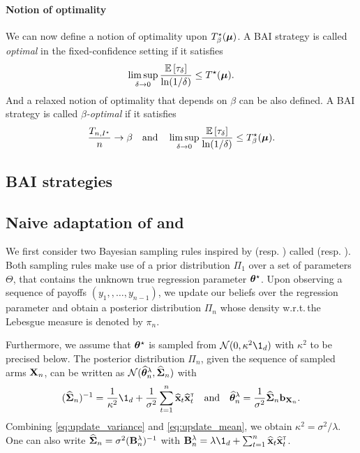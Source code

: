 \paragraph{Notion of optimality}
We can now define a notion of optimality upon $T^\star_\beta({\boldsymbol \mu})$. A BAI strategy is called \emph{optimal} in the fixed-confidence setting if it satisfies
\[
    \limsup_{\delta \rightarrow 0}\frac{\mathbb{E}\left[\tau_\delta\right]}{\ln(1/\delta)} \leq T^\star({\boldsymbol \mu}).
\]
And a relaxed notion of optimality that depends on $\beta$ can be also defined. A BAI strategy is called \emph{$\beta$-optimal} if it satisfies 
\[
    \frac{T_{n,I^\star}}{n}\rightarrow \beta \quad \text{and} \quad \limsup_{\delta \rightarrow 0}\frac{\mathbb{E}\left[\tau_\delta\right]}{\ln(1/\delta)} \leq T^\star_\beta({\boldsymbol \mu}).
\]

\subsection{BAI strategies}

\subsection{Naive adaptation of \TTTS{} and \TCC{}}

We first consider two Bayesian sampling rules inspired by \TTTS (resp. \TCC) called \LTCS (resp. \LTCC). Both sampling rules make use of a prior distribution $\Pi_1$ over a set of parameters $\Theta$, that contains the unknown true regression parameter ${\boldsymbol \theta}^\star$. Upon observing a sequence of payoffs $(y_1,,\ldots,y_{n-1})$, we update our beliefs over the regression parameter and obtain a posterior distribution $\Pi_{n}$ whose density w.r.t.\,the Lebesgue measure is denoted by $\pi_n$.

Furthermore, we assume that ${\boldsymbol \theta}^\star$ is sampled from $\cN(0,\kappa^2\1_d)$ with $\kappa^2$ to be precised below. The posterior distribution $\Pi_n$, given the sequence of sampled arms ${\bf X}_n$, can be written as $\mathcal{N}(\widehat{{\boldsymbol \theta}}^\lambda_n,\widehat{{\boldsymbol \Sigma}}_n)$ %
with
\begin{align}\label{eq:update_variance}
     (\hat{\bSigma}_n)^{-1} = \frac{1}{\kappa^2}\1_d + \frac{1}{\sigma^2}\sum_{t=1}^n \hat{\bx}_t\hat{\bx}_t\transpose \quad \text{and} \quad \hat{\btheta}^\lambda_n = \frac{1}{\sigma^2}\hat{\bSigma}_n \bb_{\bX_n}.
\end{align}
Combining \eqref{eq:update_variance} and \eqref{eq:update_mean}, we obtain $\kappa^2 = \sigma^2/\lambda$. One can also write $\widehat{{\boldsymbol \Sigma}}_n = \sigma^2 ({\bf B}^{\lambda}_n)^{-1}$ with $\bB_n^\lambda = \lambda \1_d + \sum_{t=1}^n \hat{\bx}_t\hat{\bx}_t\transpose$. 

